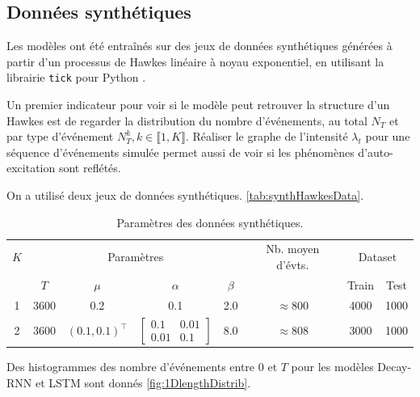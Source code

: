 \documentclass[../main.tex]{subfiles}
\begin{document}
\subsection{Données synthétiques}\label{ssec:synthResults}

Les modèles ont été entraînés sur des jeux de données synthétiques générées à partir d'un processus de Hawkes linéaire à noyau exponentiel, en utilisant la librairie \verb|tick| pour Python \cite{2017arXiv170703003B}.

Un premier indicateur pour voir si le modèle peut retrouver la structure d'un Hawkes est de regarder la distribution du nombre d'événements, au total $N_T$ et par type d'événement $N^k_T, k\in\llbracket 1,K\rrbracket$. Réaliser le graphe de l'intensité $\lambda_t$ pour une séquence d'événements simulée permet aussi de voir si les phénomènes d'auto-excitation sont reflétés.

On a utilisé deux jeux de données synthétiques. \autoref{tab:synthHawkesData}.

\begin{table}[h]
	\centering
	\begin{tabular}{@{}cccccccc}
		\toprule
		$K$ & \multicolumn{4}{c}{Paramètres} & Nb. moyen d'évts. & \multicolumn{2}{c}{Dataset} \\ \cmidrule(r){2-5}\cmidrule(r){7-8}
		    & $T$ & $\mu$ & $\alpha$ & $\beta$ & & Train & Test\\ \midrule
		1 & 3600 & 0.2 & 0.1 & 2.0 & $\approx 800$ & 4000 & 1000 \\ \midrule
		2 & 3600 & $(0.1, 0.1)^\intercal$ & $\begin{bmatrix}0.1 & 0.01\\0.01 &0.1\end{bmatrix}$ & 8.0 & $\approx 808$ & 3000 & 1000\\
		\bottomrule
	\end{tabular}
	\caption{Paramètres des données synthétiques.}\label{tab:synthHawkesData}
\end{table}

Des histogrammes des nombre d'événements entre $0$ et $T$ pour les modèles Decay-RNN et LSTM sont donnés \autoref{fig:1DlengthDistrib}.
\end{document}
